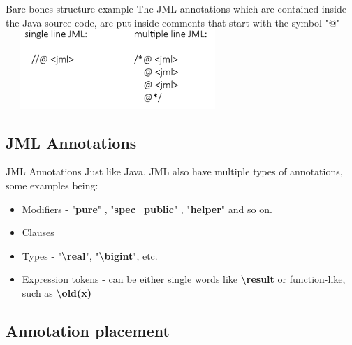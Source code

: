 \documentclass{beamer}
\begin{document}
\begin{frame}{Bare-bones structure example}
The JML annotations which are contained inside the Java source code, are put inside comments that start with the symbol "@" \\ \bigskip
        \centering\includegraphics[width=8.5cm,height=3cm]{pic/jmlstruc.png}
\end{frame}

\subsection{JML Annotations}
\begin{frame}{JML Annotations}
    Just like Java, JML also have multiple types of annotations, some examples being:
    \begin{itemize}
        \item Modifiers - "\textbf{pure}" , "\textbf{spec\_public}" , "\textbf{helper}" and so on.%
        
        \item Clauses%
        \item Types - "\textbf{\textbackslash real}", "\textbf{\textbackslash bigint}", etc.%
        \item Expression tokens - can be either single words like \textbf{\textbackslash result} or function-like, such as \textbf{\textbackslash old(x)}%
    \end{itemize}
\end{frame}

\subsection{Annotation placement}
\end{document}
